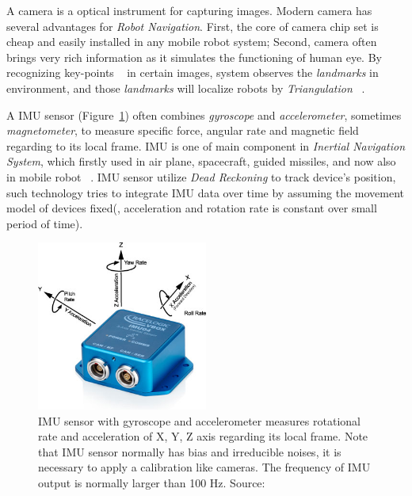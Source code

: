 A camera is a optical instrument for capturing images. Modern camera has several advantages for \textit{Robot Navigation}. First, the core of camera chip set is cheap and easily installed in any mobile robot system; Second, camera often brings very rich information as it simulates the functioning of human eye. By recognizing key-points ~\cite{shi1994good, lowe1999object, rosten2010faster} in certain images, system observes the \textit{landmarks} in environment, and those \textit{landmarks} will localize robots by \textit{Triangulation} ~\cite{davison2003real, klein2007parallel, eade2007monocular}.

A IMU sensor (Figure~\ref{fig:fig1-1}) often combines \textit{gyroscope} and \textit{accelerometer}, sometimes \textit{magnetometer}, to measure specific force, angular rate and magnetic field regarding to its local frame. IMU is one of main component in \textit{Inertial Navigation System}, which firstly used in air plane, spacecraft, guided missiles, and now also in mobile robot ~\cite{batalin2004mobile, lee2009position, mourikis2007multi, forster2015imu}. IMU sensor utilize \textit{Dead Reckoning} to track device's position, such technology tries to integrate IMU data over time by assuming the movement model of devices fixed(\ie, acceleration and rotation rate is constant over small period of time). 

\begin{figure}
    \centering
    \includegraphics[width=0.5\textwidth]{CONTENT/Figure/Figure1-1_IMU_Sensor.jpg}
    \caption{IMU sensor with gyroscope and accelerometer measures rotational rate and acceleration of X, Y, Z axis regarding its local frame. Note that IMU sensor normally has bias and irreducible noises, it is necessary to apply a calibration like cameras. The frequency of IMU output is normally larger than 100 Hz. Source: \cite{Figure1-1_IMU_Sensor}}
    \label{fig:fig1-1}
\end{figure}


